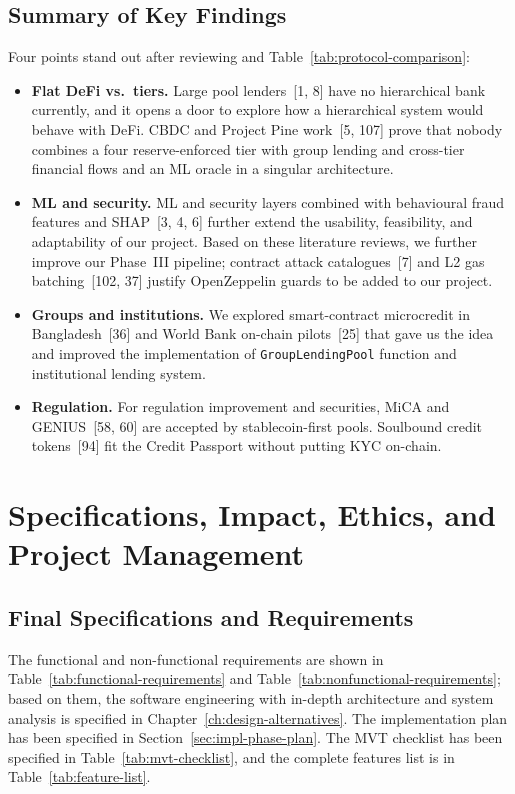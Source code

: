 \documentclass[12pt,a4paper]{report}
\begin{document}
\section{Summary of Key Findings}
\label{sec:lit-key-findings}

Four points stand out after reviewing and Table~\ref{tab:protocol-comparison}:

\begin{itemize}[noitemsep]
\item \textbf{Flat DeFi vs.\ tiers.} Large pool lenders~[1, 8] have no hierarchical bank currently, and it opens a door to explore how a hierarchical system would behave with DeFi. CBDC and Project Pine work~[5, 107] prove that nobody combines a four reserve-enforced tier with group lending and cross-tier financial flows and an ML oracle in a singular architecture.
\item \textbf{ML and security.} ML and security layers combined with behavioural fraud features and SHAP~[3, 4, 6] further extend the usability, feasibility, and adaptability of our project. Based on these literature reviews, we further improve our Phase~III pipeline; contract attack catalogues~[7] and L2 gas batching~[102, 37] justify OpenZeppelin guards to be added to our project.
\item \textbf{Groups and institutions.} We explored smart-contract microcredit in Bangladesh~[36] and World Bank on-chain pilots~[25] that gave us the idea and improved the implementation of \texttt{GroupLendingPool} function and institutional lending system.
\item \textbf{Regulation.} For regulation improvement and securities, MiCA and GENIUS~[58, 60] are accepted by stablecoin-first pools. Soulbound credit tokens~[94] fit the Credit Passport without putting KYC on-chain.
\end{itemize}

\chapter{Specifications, Impact, Ethics, and Project Management}
\label{ch:specifications-impact}

\section{Final Specifications and Requirements}
\label{sec:specifications-requirements}
The functional and non-functional requirements are shown in Table~\ref{tab:functional-requirements} and Table~\ref{tab:nonfunctional-requirements}; based on them, the software engineering with in-depth architecture and system analysis is specified in Chapter~\ref{ch:design-alternatives}. The implementation plan has been specified in Section~\ref{sec:impl-phase-plan}. The MVT checklist has been specified in Table~\ref{tab:mvt-checklist}, and the complete features list is in Table~\ref{tab:feature-list}.
\end{document}
